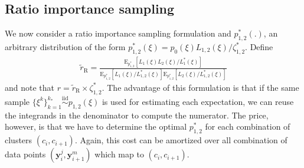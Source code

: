 \documentclass{article}
\begin{document}
\subsection{Ratio importance sampling}
We now consider a ratio importance sampling formulation and $p_{1,2}^*(.)$, an arbitrary distribution of the form $p_{1,2}^*(\xi)=p_0(\xi)L_{1,2}(\xi)/\zeta_{1,2}^*$. Define
\begin{align}
\tilde{r}_{\mathrm{R}}=\frac{\mathrm{E}_{p_{1,2}^*}[L_{1}(\xi)L_{2}(\xi)/L_{1}^*(\xi)]}{\mathrm{E}_{p_{1,2}^*}[L_{1}(\xi)/L_{1,2}^*(\xi)]\mathrm{E}_{p_{1,2}^*}[L_{2}(\xi)/L_{1,2}^*(\xi)]}
\end{align}and note that $r=\tilde{r}_{\mathrm{R}}\times \zeta_{1,2}^*$. The advantage of this formulation is that if the same sample $\{\xi^k\}_{k=1}^{k_*}\stackrel{\mathrm{iid}}{\sim} p_{1,2}(\xi)$ is used for estimating each expectation, we can reuse the integrands in the denominator to compute the numerator. The price, however, is that we have to determine the optimal $p_{1,2}^*$ for each combination of clusters $(c_i,c_{i+1})$. Again, this cost can be amortized over all combination of data points $(\mathbf{y}_i^j,\mathbf{y}_{i+1}^m)$ which map to $(c_i,c_{i+1})$.
\end{document}
